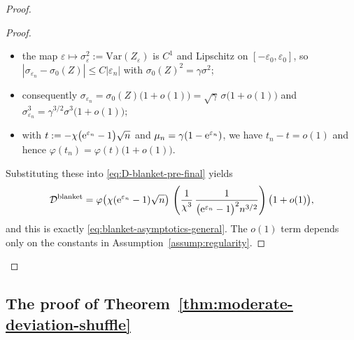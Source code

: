 \documentclass{article}
\theoremstyle{plain}
\theoremstyle{definition}
\begin{document}
\begin{proof}
\begin{proof}
\begin{itemize}
  \item the map $\varepsilon\mapsto\sigma_\varepsilon^2
          :=\mathrm{Var}(Z_\varepsilon)$ is $C^1$ and Lipschitz on
        $[-\varepsilon_0,\varepsilon_0]$, so
        $|\sigma_{\varepsilon_n}-\sigma_0(Z)|\le C|\varepsilon_n|$
        with $\sigma_0(Z)^2=\gamma\sigma^2$;
  \item consequently
        \(
          \sigma_{\varepsilon_n}
          = \sigma_0(Z)\bigl(1+o(1)\bigr)
          = \sqrt{\gamma}\,\sigma\bigl(1+o(1)\bigr)
        \)
        and
        \(
          \sigma_{\varepsilon_n}^3
          = \gamma^{3/2}\sigma^3\bigl(1+o(1)\bigr);
        \)
  \item with
        \(
          t
          := -\chi\bigl({\rm e}^{\varepsilon_n}-1\bigr)\sqrt{n}
        \)
        and
        $\mu_n=\gamma(1-{\rm e}^{\varepsilon_n})$, we have
        $t_n-t=o(1)$ and hence
        $\varphi(t_n) = \varphi(t)\bigl(1+o(1)\bigr)$.
\end{itemize}

Substituting these into \eqref{eq:D-blanket-pre-final} yields
\[
  \mathcal D^{\mathrm{blanket}}
  =
  \varphi\bigl(\chi({\rm e}^{\varepsilon_n}-1)\sqrt{n}\bigr)\,
  \left(
    \frac{1}{\chi^3}\,
    \frac{1}{\bigl({\rm e}^{\varepsilon_n}-1\bigr)^2 n^{3/2}}
  \right)\bigl(1+o(1)\bigr),
\]
and this is exactly \eqref{eq:blanket-asymptotics-general}.
The $o(1)$ term depends only on the constants in
Assumption~\ref{assump:regularity}.
\end{proof}





\end{proof}


\subsection{The proof of Theorem~\ref{thm:moderate-deviation-shuffle}}
\label{app:proof-moderate-deviations-shuffle}

\shufflingdeltaband*
\end{document}
